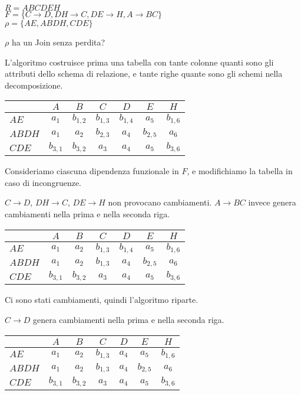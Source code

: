 \begin{exmp}
$R = ABCDEH$ \\
$F = \{ C \to D, DH \to C, DE \to H, A \to BC \}$ \\
$\rho = \{AE, ABDH, CDE\}$

$\rho$ ha un Join senza perdita?

L'algoritmo costruisce prima una tabella con tante colonne quanti sono gli attributi dello schema di relazione, e tante righe quante sono gli schemi nella decomposizione.

\begin{tabular}{l|*{6}{c}}
& $A$ & $B$ & $C$ & $D$ & $E$ & $H$ \\
\hline
$AE$ & $a_1$ & $b_{1,2}$ & $b_{1,3}$ & $b_{1,4}$ & $a_5$ & $b_{1,6}$ \\
$ABDH$ & $a_1$ & $a_2$ & $b_{2,3}$ & $a_4$ & $b_{2,5}$ & $a_6$ \\
$CDE$ & $b_{3,1}$ & $b_{3,2}$ & $a_3$ & $a_4$ & $a_5$ & $b_{3,6}$
\end{tabular}

Consideriamo ciascuna dipendenza funzionale in $F$, e modifichiamo la tabella in caso di incongruenze.

$C \to D$, $DH \to C$, $DE \to H$ non provocano cambiamenti. $A \to BC$ invece genera cambiamenti nella prima e nella seconda riga.

\begin{tabular}{l|*{6}{c}}
& $A$ & $B$ & $C$ & $D$ & $E$ & $H$ \\
\hline
$AE$ & $a_1$ & \cellcolor{green!20} $a_2$ & $b_{1,3}$ & $b_{1,4}$ & $a_5$ & $b_{1,6}$ \\
$ABDH$ & $a_1$ & $a_2$ & \cellcolor{green!20} $b_{1,3}$ & $a_4$ & $b_{2,5}$ & $a_6$ \\
$CDE$ & $b_{3,1}$ & $b_{3,2}$ & $a_3$ & $a_4$ & $a_5$ & $b_{3,6}$
\end{tabular}

Ci sono stati cambiamenti, quindi l'algoritmo riparte.

$C \to D$ genera cambiamenti nella prima e nella seconda riga.

\begin{tabular}{l|*{6}{c}}
& $A$ & $B$ & $C$ & $D$ & $E$ & $H$ \\
\hline
$AE$ & $a_1$ & $a_2$ & $b_{1,3}$ & \cellcolor{green!20} $a_4$ & $a_5$ & $b_{1,6}$ \\
$ABDH$ & $a_1$ & $a_2$ & $b_{1,3}$ & $a_4$ & $b_{2,5}$ & $a_6$ \\
$CDE$ & $b_{3,1}$ & $b_{3,2}$ & $a_3$ & $a_4$ & $a_5$ & $b_{3,6}$
\end{tabular}


\end{exmp}
